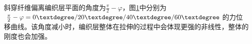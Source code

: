 斜穿纤维偏离编织层平面的角度为$ \frac{\pi }{2} - \varphi  $，图\ref{fig:phi-MOD}中分别为$ \frac{\pi }{2} - \varphi  = 0\textdegree/20\textdegree/40\textdegree/60\textdegree$的力位移曲线。该角度减小时，编织层整体在拉伸的过程中会体现更强的非线性，整体的刚度也会加强。
\begin{figure}[!htp]
	\centering
		
	\label{fig:phi-MOD}
\end{figure}






